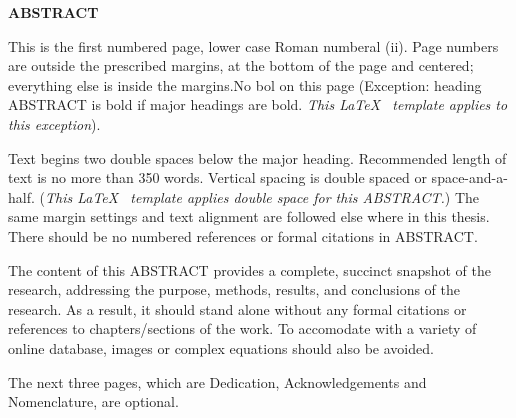 {} %

\begin{spacing}{2}
\begin{center}
\MakeUppercase{\textbf{\large Abstract}}
\end{center}



This is the first numbered page, lower case Roman numberal (ii). Page numbers are outside the prescribed margins, at the bottom of the page and centered; everything else is inside the margins.No bol on this page (Exception: heading ABSTRACT is bold if major headings are bold. \emph{This \LaTeX ~ template applies to this exception}).

Text begins two double spaces below the major heading. Recommended length of text is no more than 350 words. Vertical spacing is double spaced or space-and-a-half. (\emph{This \LaTeX ~ template applies double space for this ABSTRACT.}) The same margin settings and text alignment are followed else where in this thesis. There should be no numbered references or formal citations in ABSTRACT.

The content of this ABSTRACT provides a complete, succinct snapshot of the research, addressing the purpose, methods, results, and conclusions of the research. As a result, it should stand alone without any formal citations or references to chapters/sections of the work. To accomodate with a variety of online database, images or complex equations should also be avoided.

The next three pages, which are Dedication, Acknowledgements and Nomenclature, are optional.

\end{spacing}

